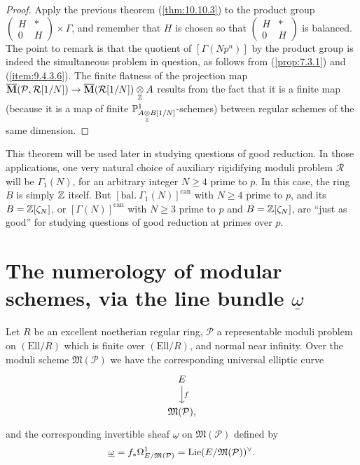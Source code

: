 \begin{proof}
Apply the previous theorem (\ref{thm:10.10.3}) to the product group $\begin{pmatrix} H & * \\ 0 & H \end{pmatrix} \times \Gamma$, and remember that $H$ is chosen so that $\begin{pmatrix} H & * \\ 0 & H \end{pmatrix}$ is balanced. The point to remark is that the quotient of $[\Gamma(Np^n)]$ by the product group is indeed the simultaneous problem in question, as follows from (\ref{prop:7.3.1}) and (\ref{item:9.4.3.6}). The finite flatness of the projection map $\overline{\mathbf{M}}(\mathcal{P}, \mathcal{R}[1/N]) \to \overline{\mathbf{M}}(\mathcal{R}[1/N]) \underset{\mathbb{Z}}{\otimes} A$ results from the fact that it is a finite map (because it is a map of finite $\mathbb{P}^1_{A \underset{\mathbb{Z}}{\otimes} B[1/N]}$-schemes) between regular schemes of the same dimension.
\end{proof}

\begin{krem}\label{rem:10.12.3}
This theorem will be used later in studying questions of good reduction. In those applications, one very natural choice of auxiliary rigidifying moduli problem $\mathcal{R}$ will be $\Gamma_1(N)$, for an arbitrary integer $N \ge 4$ prime to $p$. In this case, the ring $B$ is simply $\mathbb{Z}$ itself. But $[\mathrm{bal.}\ \Gamma_1(N)]^{\mathrm{can}}$ with $N \ge 4$ prime to $p$, and its $B = \mathbb{Z}[\zeta_N]$, or $[\Gamma(N)]^{\mathrm{can}}$ with $N \ge 3$ prime to $p$ and $B = \mathbb{Z}[\zeta_N]$, are ``just as good'' for studying questions of good reduction at primes over $p$.
\end{krem}

\section{The numerology of modular schemes, via the line bundle \texorpdfstring{$\underline{\omega}$}{ω}}
\label{sec:10.13}

\kmitem\label{item:10.13.1}
Let $R$ be an excellent noetherian regular ring, $\mathcal{P}$ a representable moduli problem on $(\mathrm{Ell}/R)$ which is finite over $(\mathrm{Ell}/R)$, and normal near infinity. Over the moduli scheme $\mathfrak{M}(\mathcal{P})$ we have the corresponding universal elliptic curve
\[
\begin{tikzcd}[row sep=1.8em]
E \arrow[d, "f"] \\
\mathfrak{M}(\mathcal{P}) ,
\end{tikzcd}
\]
and the corresponding invertible sheaf $\underline{\omega}$ on $\mathfrak{M}(\mathcal{P})$ defined by
\begin{equation}\label{eq:10.13.1.1}
\underline{\omega} = f_*\Omega^1_{E/\mathfrak{M}(\mathcal{P})} = \operatorname{Lie}(E/\mathfrak{M}(\mathcal{P}))^\vee .
\end{equation}

